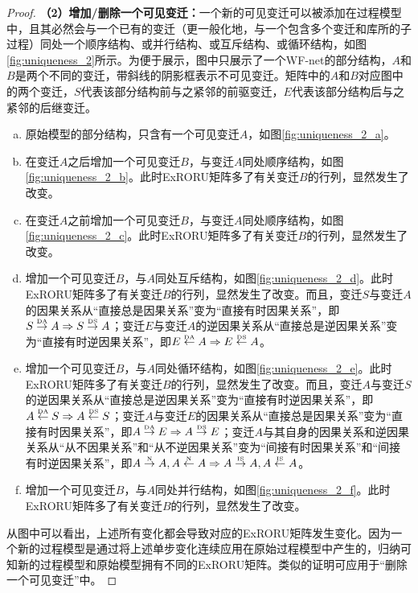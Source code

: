 \begin{proof}
\textbf{（2）增加/删除一个可见变迁：}一个新的可见变迁可以被添加在过程模型中，且其必然会与一个已有的变迁（更一般化地，与一个包含多个变迁和库所的子过程）同处一个顺序结构、或并行结构、或互斥结构、或循环结构，如图\ref{fig:uniqueness_2}所示。为便于展示，图中只展示了一个WF-net的部分结构，$A$和$B$是两个不同的变迁，带斜线的阴影框表示不可见变迁。矩阵中的$A$和$B$对应图中的两个变迁，$S$代表该部分结构前与之紧邻的前驱变迁，$E$代表该部分结构后与之紧邻的后继变迁。
\begin{enumerate}[(a)]
  \item 原始模型的部分结构，只含有一个可见变迁$A$，如图\ref{fig:uniqueness_2_a}。
  \item 在变迁$A$之后增加一个可见变迁$B$，与变迁$A$同处顺序结构，如图\ref{fig:uniqueness_2_b}。此时ExRORU矩阵多了有关变迁$B$的行列，显然发生了改变。
  \item 在变迁$A$之前增加一个可见变迁$B$，与变迁$A$同处顺序结构，如图\ref{fig:uniqueness_2_c}。此时ExRORU矩阵多了有关变迁$B$的行列，显然发生了改变。
  \item 增加一个可见变迁$B$，与$A$同处互斥结构，如图\ref{fig:uniqueness_2_d}。此时ExRORU矩阵多了有关变迁$B$的行列，显然发生了改变。而且，变迁$S$与变迁$A$的因果关系从“直接总是因果关系”变为“直接有时因果关系”，即$S\overset{\text{\tiny{DA}}}{\rightarrow}A\Rightarrow S\overset{\text{\tiny{DS}}}{\rightarrow}A$；变迁$E$与变迁$A$的逆因果关系从“直接总是逆因果关系”变为“直接有时逆因果关系”，即$E\overset{\text{\tiny{DA}}}{\leftarrow}A\Rightarrow E\overset{\text{\tiny{DS}}}{\leftarrow}A$。
  \item 增加一个可见变迁$B$，与$A$同处循环结构，如图\ref{fig:uniqueness_2_e}。此时ExRORU矩阵多了有关变迁$B$的行列，显然发生了改变。而且，变迁$A$与变迁$S$的逆因果关系从“直接总是逆因果关系”变为“直接有时逆因果关系”，即$A\overset{\text{\tiny{DA}}}{\leftarrow}S\Rightarrow A\overset{\text{\tiny{DS}}}{\leftarrow}S$；变迁$A$与变迁$E$的因果关系从“直接总是因果关系”变为“直接有时因果关系”，即$A\overset{\text{\tiny{DA}}}{\rightarrow}E\Rightarrow A\overset{\text{\tiny{DS}}}{\rightarrow}E$；变迁$A$与其自身的因果关系和逆因果关系从“从不因果关系”和“从不逆因果关系”变为“间接有时因果关系”和“间接有时逆因果关系”，即$A\overset{\text{\tiny{N}}}{\rightarrow}A,A\overset{\text{\tiny{N}}}{\leftarrow}A\Rightarrow A\overset{\text{\tiny{IS}}}{\rightarrow}A,A\overset{\text{\tiny{IS}}}{\leftarrow}A$。
  \item 增加一个可见变迁$B$，与$A$同处并行结构，如图\ref{fig:uniqueness_2_f}。此时ExRORU矩阵多了有关变迁$B$的行列，显然发生了改变。
\end{enumerate}
从图中可以看出，上述所有变化都会导致对应的ExRORU矩阵发生变化。因为一个新的过程模型是通过将上述单步变化连续应用在原始过程模型中产生的，归纳可知新的过程模型和原始模型拥有不同的ExRORU矩阵。类似的证明可应用于“删除一个可见变迁”中。


\end{proof}
